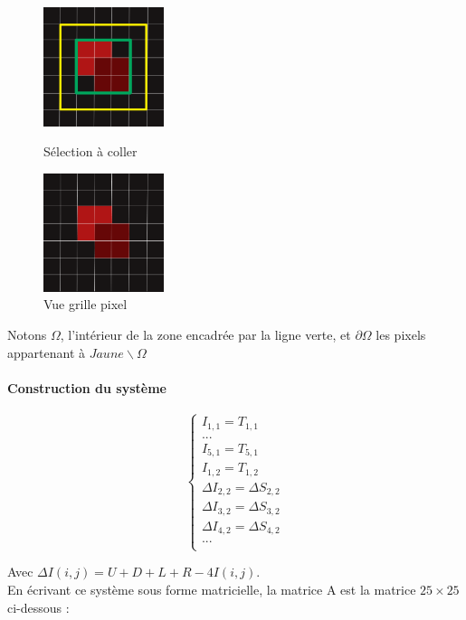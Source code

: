 \begin{figure}[!htb]
   \begin{minipage}{0.5\textwidth}
     \centering
     \includegraphics[width = 100pt]{Images/carre_selection.png}
\caption{Sélection à coller}
      \end{minipage}\hfill
         \begin{minipage}{0.5\textwidth}
     \centering
     \includegraphics[width = 100pt]{Images/pix.png}
\caption{Vue grille pixel}
      \end{minipage}\hfill
      \end{figure}
\newpage

Notons $\Omega$, l'intérieur de la zone encadrée par la ligne verte, et $\partial \Omega$ les pixels appartenant à $Jaune \backslash \Omega$


\paragraph{Construction du système}
\begin{center}
\begin{equation}
\left\{
\begin{aligned}
I_{1,1} = T_{1,1}\\
...\\
I_{5,1} = T_{5,1}\\
I_{1,2} = T_{1,2}\\
\Delta I_{2,2} = \Delta S_{2,2}\\
\Delta I_{3,2} = \Delta S_{3,2}\\
\Delta I_{4,2} = \Delta S_{4,2}\\
...\\
\end{aligned}
\right.
\end{equation}
\end{center}
Avec $\Delta I(i,j) = U+D+L+R-4I(i,j)$.\\
En écrivant ce système sous forme matricielle, la matrice A est la matrice $25\times 25$ ci-dessous :  

